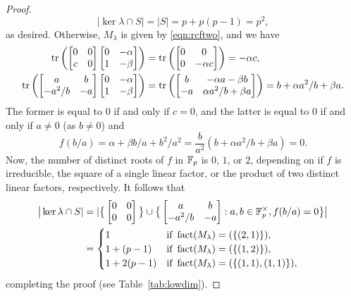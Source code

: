\begin{proof}
\begin{equation*}
|\ker\lambda\cap S|=|S|=p+p(p-1)=p^2,
\end{equation*}
as desired. Otherwise, $M_\lambda$ is given by \eqref{eqn:rcftwo}, and we have
\begin{equation}
\label{eqn:linrels}
\begin{split}
\operatorname{tr}\left(
\begin{bmatrix}
0&0\\
c&0
\end{bmatrix}
\begin{bmatrix}
0&-\alpha\\
1&-\beta
\end{bmatrix}\right)
&=
\operatorname{tr}\left(
\begin{bmatrix}
0&0\\
0&-\alpha c
\end{bmatrix}\right)
=-\alpha c,\\
\operatorname{tr}\left(
\begin{bmatrix}
a&b\\
-a^2/b&-a
\end{bmatrix}
\begin{bmatrix}
0&-\alpha\\
1&-\beta
\end{bmatrix}\right)
&=
\operatorname{tr}\left(
\begin{bmatrix}
b&-\alpha a-\beta b\\
-a&\alpha a^2/b+\beta a
\end{bmatrix}\right)
=b+\alpha a^2/b+\beta a.
\end{split}
\end{equation}
The former is equal to $0$ if and only if $c=0$, and the latter is equal to $0$ if and only if $a\ne 0$ (as $b\ne 0$) and
\begin{equation*}
f(b/a)=\alpha+\beta b/a+b^2/a^2=\frac{b}{a^2}(b+\alpha a^2/b+\beta a)=0.
\end{equation*}
Now, the number of distinct roots of $f$ in $\mathbb{F}_p$ is $0$, $1$, or $2$, depending on if $f$ is irreducible, the square of a single linear factor, or the product of two distinct linear factors, respectively. It follows that
\begin{align*}
\big|\ker\lambda\cap S|&=|\big\{\begin{bmatrix}
0&0\\
0&0
\end{bmatrix}\big\}\cup
\big\{\begin{bmatrix}
a&b\\
-a^2/b&-a
\end{bmatrix}
:a,b\in\mathbb{F}_p^\times, f(b/a)=0\big\}\big|\\
&=\begin{cases}
1&\text{if }\operatorname{fact}(M_\lambda)=(\{(2,1)\}),\\
1+(p-1)&\text{if }\operatorname{fact}(M_\lambda)=(\{(1,2)\}),\\
1+2(p-1)&\text{if }\operatorname{fact}(M_\lambda)=(\{(1,1),(1,1)\}),
\end{cases}
\end{align*}
completing the proof (see Table~\ref{tab:lowdim}).
\end{proof}
